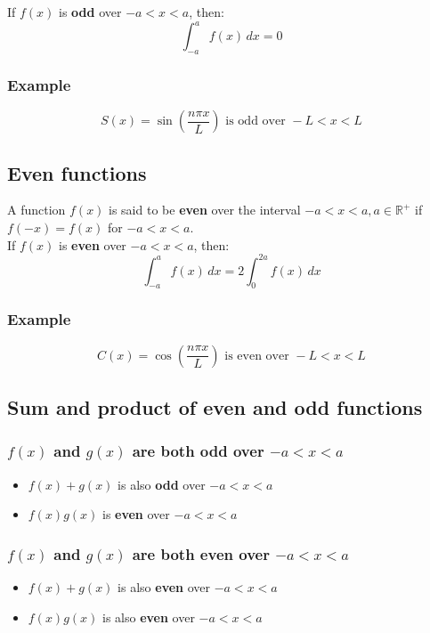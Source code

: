 \documentclass[11pt]{article}
\begin{document}
If \(f(x)\) is \textbf{odd} over \(-a < x < a\), then:
\[\int_{-a}^{a} f(x) \, dx = 0\]

\subsubsection{Example}
\label{sec:org1ceee30}
\[S(x) = \sin \left( \frac{n \pi x}{L} \right) \text{ is odd over } -L < x < L\]

\subsection{Even functions}
\label{sec:orgda8d5a0}
A function \(f(x)\) is said to be \textbf{even} over the interval \(- a < x < a, a \in \mathbb{R}^{+}\) if \(f(-x) = f(x)\) for \(-a < x < a\).  \\

If \(f(x)\) is \textbf{even} over \(-a < x < a\), then:
\[\int_{-a}^{a} f(x) \, dx = 2 \int_0^{2a} f(x) \, dx\]

\subsubsection{Example}
\label{sec:orgc725f77}
\[C(x) = \cos \left( \frac{n \pi x}{L} \right) \text{ is even over } -L < x < L\]

 \newpage

\subsection{Sum and product of even and odd functions}
\label{sec:orgf8c70d5}

\subsubsection{\(f(x)\) and \(g(x)\) are both odd over \(- a < x < a\)}
\label{sec:orgdf23d06}
\begin{itemize}
\item \(f(x) + g(x)\) is also \textbf{odd} over \(- a < x < a\)
\item \(f(x) g(x)\) is \textbf{even} over \(- a < x < a\)
\end{itemize}

\subsubsection{\(f(x)\) and \(g(x)\) are both even over \(- a < x < a\)}
\label{sec:org3f9c0fe}
\begin{itemize}
\item \(f(x) + g(x)\) is also \textbf{even} over \(- a < x < a\)
\item \(f(x) g(x)\) is also \textbf{even} over \(- a < x < a\)
\end{itemize}
\end{document}
